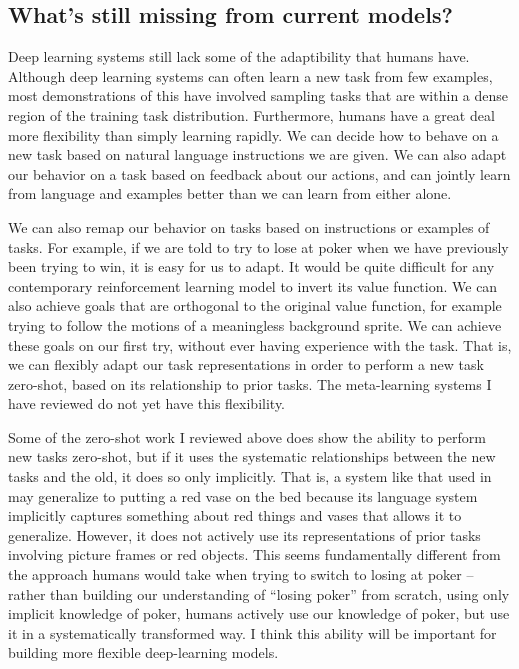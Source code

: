 \subsection{What's still missing from current models?}

Deep learning systems still lack some of the adaptibility that humans have. Although deep learning systems can often learn a new task from few examples, most demonstrations of this have involved sampling tasks that are within a dense region of the training task distribution. Furthermore, humans have a great deal more flexibility than simply learning rapidly. We can decide how to behave on a new task based on natural language instructions we are given. We can also adapt our behavior on a task based on feedback about our actions, and can jointly learn from language and examples better than we can learn from either alone. \par
We can also remap our behavior on tasks based on instructions or examples of tasks. For example, if we are told to try to lose at poker when we have previously been trying to win, it is easy for us to adapt. It would be quite difficult for any contemporary reinforcement learning model to invert its value function. We can also achieve goals that are orthogonal to the original value function, for example trying to follow the motions of a meaningless background sprite. We can achieve these goals on our first try, without ever having experience with the task. That is, we can flexibly adapt our task representations in order to perform a new task zero-shot, based on its relationship to prior tasks. The meta-learning systems I have reviewed do not yet have this flexibility. \par
Some of the zero-shot work I reviewed above does show the ability to perform new tasks zero-shot, but if it uses the systematic relationships between the new tasks and the old, it does so only implicitly. That is, a system like that used in \citet{Hill2019a} may generalize to putting a red vase on the bed because its language system implicitly captures something about red things and vases that allows it to generalize. However, it does not actively use its representations of prior tasks involving picture frames or red objects. This seems fundamentally different from the approach humans would take when trying to switch to losing at poker -- rather than building our understanding of ``losing poker'' from scratch, using only implicit knowledge of poker, humans actively use our knowledge of poker, but use it in a systematically transformed way. I think this ability will be important for building more flexible deep-learning models. \par
